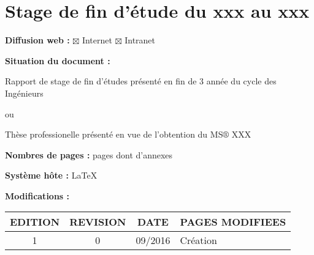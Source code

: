 \section*{Stage de fin d'étude du xxx au xxx }
\vspace{0.3cm}
\textbf{Diffusion web :} $\boxtimes$ Internet \hspace{0.2cm}$\boxtimes$ Intranet\hspace{0.2cm}
\vspace{0.3cm}

\textbf{Situation du document :} 
\vspace{0.2cm}
\par
{\color{red}Rapport de stage de fin d'études présenté en fin de 3 année du cycle des Ingénieurs}

ou

{\color{magenta}Thèse professionelle présenté en vue de l'obtention du MS$\circledR$ XXX}
\vspace{0.3cm}



\textbf{Nombres de pages :}  pages dont  d'annexes
\vspace{0.3cm}

\textbf{Système hôte :} \LaTeX
\vspace{1cm}


\textbf{Modifications :} 
\begin{center}
\begin{tabular}{|c|c|c|>{\centering}p{6.5cm}|}
\hline 
EDITION & REVISION & DATE & PAGES MODIFIEES\tabularnewline
\hline
\hline 
1 & 0 & 09/2016 & Création\tabularnewline
\hline 

\end{tabular}
\end{center}
